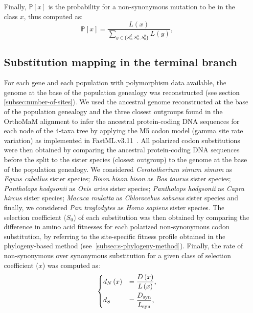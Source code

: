 \documentclass{article}
\newcommand{\proba}{\mathbb{P}}
\newcommand{\dn}{d_N}
\newcommand{\ds}{d_S}
\newcommand{\Sphy}{S_{0}}
\newcommand{\SphyDel}{\Sphy^{d}}
\newcommand{\SphyNeu}{\Sphy^{n}}
\newcommand{\SphyBen}{\Sphy^{b}}
\newcommand{\Sphyclass}{x}
\newcommand{\SphyclassAlt}{y}
\begin{document}
    Finally, $\proba [ \Sphyclass ]$ is the probability for a non-synonymous mutation to be in the class $\Sphyclass$, thus computed as:
    \begin{equation}
        \proba[\Sphyclass] = \frac{L\left( \Sphyclass \right)}{\sum_{\SphyclassAlt\in \{\SphyDel, \SphyNeu, \SphyBen \} } L\left(\SphyclassAlt \right)},
        \label{eq:proba-dfe-mutsel}
    \end{equation}

    \subsection{Substitution mapping in the terminal branch}
    \label{subsec:substitution-mapping-in-the-terminal-branch}
    For each gene and each population with polymorphism data available, the genome at the base of the population genealogy was reconstructed (see section \ref{subsec:nunber-of-sites}).
    We used the ancestral genome reconstructed at the base of the population genealogy and the three closest outgroups found in the OrthoMaM alignment to infer the ancestral protein-coding DNA sequences for each node of the 4-taxa tree by applying the M5 codon model (gamma site rate variation) as implemented in FastML.v3.11~\cite{ashkenazy_fastml_2012}.
    All polarized codon substitutions were then obtained by comparing the ancestral protein-coding DNA sequences before the split to the sister species (closest outgroup) to the genome at the base of the population genealogy.
    We considered \textit{Ceratotherium simum simum} as \textit{Equus caballus} sister species; \textit{Bison bison bison} as \textit{Bos taurus} sister species; \textit{Pantholops hodgsonii} as \textit{Ovis aries} sister species; \textit{Pantholops hodgsonii} as \textit{Capra hircus} sister species; \textit{Macaca mulatta} as \textit{Chlorocebus sabaeus} sister species and finally, we considered \textit{Pan troglodytes} as \textit{Homo sapiens} sister species.
    The selection coefficient ($\Sphy$) of each substitution was then obtained by comparing the difference in amino acid fitnesses for each polarized non-synonymous codon substitution, by referring to the site-specific fitness profile obtained in the phylogeny-based method (see~\ref{subsec:s-phylogeny-method}).
    Finally, the rate of non-synonymous over synonymous substitution for a given class of selection coefficient ($\Sphyclass$) was computed as:
    \begin{align}
        \begin{dcases}
            \dn \left( \Sphyclass \right) &= \dfrac{D\left( \Sphyclass \right)}{L \left( \Sphyclass \right)}, \\
            \ds &= \dfrac{D_{\text{syn}}}{L_{\text{syn}}},
        \end{dcases}
    \end{align}
\end{document}

